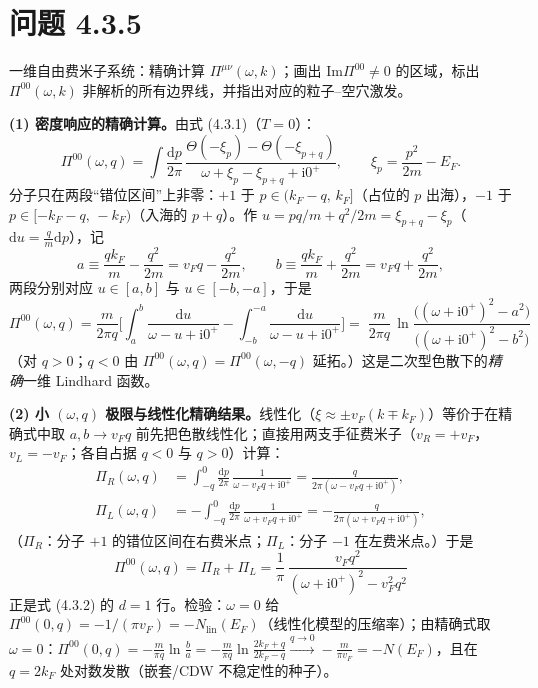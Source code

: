 \section*{问题 4.3.5}
\begin{problem}
一维自由费米子系统：精确计算 $\Pi^{\mu\nu}(\omega,k)$；画出 $\mathrm{Im}\Pi^{00}\neq0$ 的区域，标出 $\Pi^{00}(\omega,k)$ 非解析的所有边界线，并指出对应的粒子--空穴激发。
\end{problem}
\solution
\textbf{(1) 密度响应的精确计算。}由式 (4.3.1)（$T=0$）：
\begin{equation*}
\Pi^{00}(\omega,q)=\int\frac{\mathrm{d}p}{2\pi}\,
\frac{\Theta(-\xi_p)-\Theta(-\xi_{p+q})}{\omega+\xi_p-\xi_{p+q}+\mathrm{i}0^+},
\qquad \xi_p=\frac{p^2}{2m}-E_F .
\end{equation*}
分子只在两段“错位区间”上非零：$+1$ 于 $p\in(k_F-q,\,k_F]$（占位的 $p$ 出海），$-1$ 于 $p\in[-k_F-q,\,-k_F)$（入海的 $p+q$）。作 $u=pq/m+q^2/2m=\xi_{p+q}-\xi_p$（$\mathrm{d}u=\frac{q}{m}\mathrm{d}p$），记
\begin{equation*}
a\equiv\frac{qk_F}{m}-\frac{q^2}{2m}=v_Fq-\frac{q^2}{2m},\qquad
b\equiv\frac{qk_F}{m}+\frac{q^2}{2m}=v_Fq+\frac{q^2}{2m},
\end{equation*}
两段分别对应 $u\in[a,b]$ 与 $u\in[-b,-a]$，于是
\begin{equation*}
\Pi^{00}(\omega,q)=\frac{m}{2\pi q}\Big[\int_a^b\frac{\mathrm{d}u}{\omega-u+\mathrm{i}0^+}-\int_{-b}^{-a}\frac{\mathrm{d}u}{\omega-u+\mathrm{i}0^+}\Big]
=\boxed{\;\frac{m}{2\pi q}\,
\ln\frac{\big((\omega+\mathrm{i}0^+)^2-a^2\big)}{\big((\omega+\mathrm{i}0^+)^2-b^2\big)}\;}
\end{equation*}
（对 $q>0$；$q<0$ 由 $\Pi^{00}(\omega,q)=\Pi^{00}(\omega,-q)$ 延拓。）这是二次型色散下的\emph{精确}一维 Lindhard 函数。

\textbf{(2) 小 $(\omega,q)$ 极限与线性化精确结果。}线性化（$\xi\approx\pm v_F(k\mp k_F)$）等价于在精确式中取 $a,b\to v_Fq$ 前先把色散线性化；直接用两支手征费米子（$v_R=+v_F$，$v_L=-v_F$；各自占据 $q<0$ 与 $q>0$）计算：
\begin{align*}
\Pi_R(\omega,q)&=\int_{-q}^{0}\frac{\mathrm{d}p}{2\pi}\,
\frac{1}{\omega-v_Fq+\mathrm{i}0^+}=\frac{q}{2\pi(\omega-v_Fq+\mathrm{i}0^+)},\\
\Pi_L(\omega,q)&=-\int_{-q}^{0}\frac{\mathrm{d}p}{2\pi}\,
\frac{1}{\omega+v_Fq+\mathrm{i}0^+}=-\frac{q}{2\pi(\omega+v_Fq+\mathrm{i}0^+)},
\end{align*}
（$\Pi_R$：分子 $+1$ 的错位区间在右费米点；$\Pi_L$：分子 $-1$ 在左费米点。）于是
\begin{equation*}
\boxed{\;\Pi^{00}(\omega,q)=\Pi_R+\Pi_L
=\frac{1}{\pi}\,\frac{v_Fq^2}{(\omega+\mathrm{i}0^+)^2-v_F^2q^2}\;}
\end{equation*}
正是式 (4.3.2) 的 $d=1$ 行。检验：$\omega=0$ 给 $\Pi^{00}(0,q)=-1/(\pi v_F)=-N_{\text{lin}}(E_F)$（线性化模型的压缩率）；由精确式取 $\omega=0$：$\Pi^{00}(0,q)=-\frac{m}{\pi q}\ln\frac{b}{a}=-\frac{m}{\pi q}\ln\frac{2k_F+q}{2k_F-q}\xrightarrow{q\to0}-\frac{m}{\pi v_F}=-N(E_F)$，且在 $q=2k_F$ 处对数发散（嵌套/CDW 不稳定性的种子）。

